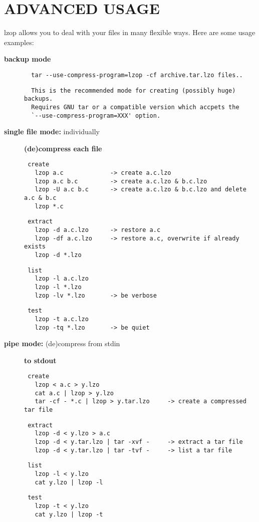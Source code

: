 \section{ADVANCED USAGE\label{ADVANCED_USAGE}}


lzop allows you to deal with your files in many flexible
ways. Here are some usage examples:

\begin{description}

\item[\textbf{backup mode}] \mbox{}\begin{verbatim}
  tar --use-compress-program=lzop -cf archive.tar.lzo files..
\end{verbatim}
\begin{verbatim}
  This is the recommended mode for creating (possibly huge) backups.
  Requires GNU tar or a compatible version which accpets the
  `--use-compress-program=XXX' option.
\end{verbatim}

\item[\textbf{single file mode:} individually] \textbf{(de)compress each file}\begin{verbatim}
 create
   lzop a.c             -> create a.c.lzo
   lzop a.c b.c         -> create a.c.lzo & b.c.lzo
   lzop -U a.c b.c      -> create a.c.lzo & b.c.lzo and delete a.c & b.c
   lzop *.c
\end{verbatim}
\begin{verbatim}
 extract
   lzop -d a.c.lzo      -> restore a.c
   lzop -df a.c.lzo     -> restore a.c, overwrite if already exists
   lzop -d *.lzo
\end{verbatim}
\begin{verbatim}
 list
   lzop -l a.c.lzo
   lzop -l *.lzo
   lzop -lv *.lzo       -> be verbose
\end{verbatim}
\begin{verbatim}
 test
   lzop -t a.c.lzo
   lzop -tq *.lzo       -> be quiet
\end{verbatim}

\item[\textbf{pipe mode:} (de)compress from stdin] \textbf{to stdout}\begin{verbatim}
 create
   lzop < a.c > y.lzo
   cat a.c | lzop > y.lzo
   tar -cf - *.c | lzop > y.tar.lzo     -> create a compressed tar file
\end{verbatim}
\begin{verbatim}
 extract
   lzop -d < y.lzo > a.c
   lzop -d < y.tar.lzo | tar -xvf -     -> extract a tar file
   lzop -d < y.tar.lzo | tar -tvf -     -> list a tar file
\end{verbatim}
\begin{verbatim}
 list
   lzop -l < y.lzo
   cat y.lzo | lzop -l
\end{verbatim}
\begin{verbatim}
 test
   lzop -t < y.lzo
   cat y.lzo | lzop -t
\end{verbatim}


\end{description}

